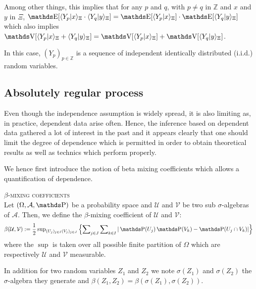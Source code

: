 Among other things, this implies that for any $p$ and $q$, with $p \neq q$ in $\mathds{Z}$ and $x$ and $y$ in $\Xi$, $\E[\langle Y_{p} \vert x \rangle_{\Xi} \cdot \langle Y_{q} \vert y \rangle_{\Xi}] = \E[\langle Y_{p} \vert x \rangle_{\Xi}] \cdot \E[\langle Y_{q} \vert y \rangle_{\Xi}]$ which also implies $\V[\langle Y_{p} \vert x \rangle_{\Xi} + \langle Y_{q} \vert y \rangle_{\Xi}] = \V[\langle Y_{p} \vert x \rangle_{\Xi}] + \V[\langle Y_{q} \vert y \rangle_{\Xi}]$.

In this case, $(Y_{p})_{p \in \mathds{Z}}$ is a sequence of independent identically distributed (i.i.d.) random variables.

\subsection{Absolutely regular process}\label{INTRO_DATA_REGULAR}\label{DEPENDENTDATA}

Even though the independence assumption is widely spread, it is also limiting as, in practice, dependent data arise often.
Hence, the inference based on dependent data gathered a lot of interest in the past and it appears clearly that one should limit the degree of dependence which is permitted in order to obtain theoretical results as well as technics which perform properly.

We hence first introduce the notion of beta mixing coefficients which allows a quantification of dependence.

\begin{de}{\textsc{$\beta$-mixing coefficients} \\}\label{DE_BETAMIXING_INTRO_DATA_REGULAR}
Let $\left(\Omega, \mathcal{A}, \P\right)$ be a probability space and $\mathcal{U}$ and $\mathcal{V}$ be two sub $\sigma$-algebras of $\mathcal{A}$.
Then, we define the $\beta$-mixing coefficient of $\mathcal{U}$ and $\mathcal{V}$:
\[\beta(\mathcal{U}, \mathcal{V}) := \frac{1}{2} \sup\nolimits_{(U_{j})_{j \in I}(V_{j})_{j \in J}}\left\{\sum\nolimits_{j \in J}\sum\nolimits_{k \in I} \vert \P(U_{j})\P(V_{k}) - \P(U_{j} \cap V_{k}) \vert \right\}\]
where the $\sup$ is taken over all possible finite partition of $\Omega$ which are respectively $\mathcal{U}$ and $\mathcal{V}$ measurable.

In addition for two random variables $Z_{1}$ and $Z_{2}$ we note $\sigma(Z_{1})$ and $\sigma(Z_{2})$ the $\sigma$-algebra they generate and $\beta\left(Z_{1}, Z_{2}\right) = \beta\left(\sigma(Z_{1}), \sigma(Z_{2})\right)$.
\assEnd
\end{de}

